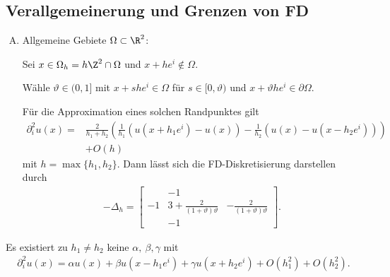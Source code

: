 \subsection{Verallgemeinerung und Grenzen von FD}


\begin{enumerate}[A)]
    \item
	Allgemeine Gebiete $\Omega \subset \R^2$:

	Sei $x \in \Omega_h = h \Z^2 \cap \Omega$ und $x + h e^i \not\in \Omega$.

	Wähle $\vartheta \in (0, 1]$ mit $x + s h e^i \in \Omega$ für
    $s \in [0, \vartheta)$ und $x + \vartheta h e^i \in \partial \Omega$.

	Für die Approximation eines solchen Randpunktes gilt
	\begin{eqnarray*}
          \partial_i^2 u(x)
        = &\frac{2}{h_1 + h_2} \left(\frac{1}{h_1}
           \left(u\left(x + h_1 e^i\right) - u(x)\right)
            - \frac{1}{h_2} \left(u(x) - u\left(x - h_2 e^i\right)\right)\right)
          \\
          &+ O(h)
	\end{eqnarray*}
	mit $h = \max\{h_1, h_2\}$. Dann lässt sich die FD-Diskretisierung
	darstellen durch
	\begin{eqnarray*}
          -\Delta_h
	    = \begin{bmatrix}
		  & -1 & \\
		  -1 & 3 + \frac{2}{(1 + \vartheta) \vartheta}
		  & -\frac{2}{(1 + \vartheta) \vartheta} \\
		  & -1 &
	      \end{bmatrix}.
	\end{eqnarray*}
\end{enumerate}


\begin{Bemerkung}
    Es existiert zu $h_1 \neq h_2$ keine $\alpha, \ \beta, \gamma$ mit
    \begin{eqnarray*}
          \partial_i^2 u(x)
        = \alpha u(x) + \beta u\left(x - h_1 e^i\right)
          + \gamma u\left(x + h_2 e^i\right) + O(h_1^2) + O(h_2^2).
    \end{eqnarray*}
\end{Bemerkung}


